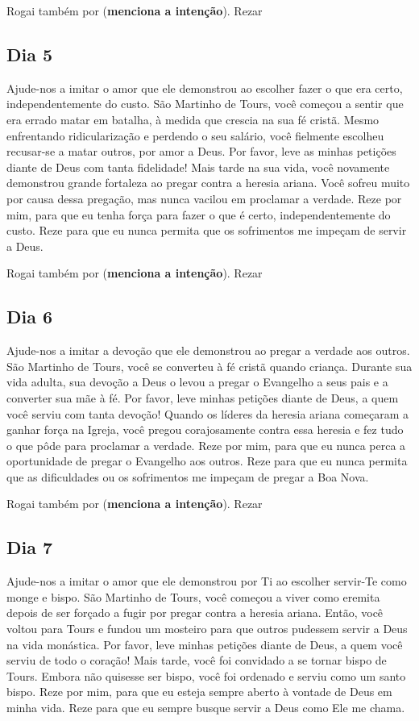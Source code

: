 \documentclass[a4paper,14pt,twoside]{extarticle} \usepackage[utf8]{inputenc}
\begin{document}
Rogai também por (\textbf{menciona a intenção}). Rezar \textbf{}

\subsection{Dia 5}
Ajude-nos a imitar o amor que ele demonstrou ao escolher fazer o que era certo, independentemente do custo. São Martinho de Tours, você começou a sentir que era errado matar em batalha, à medida que crescia na sua fé cristã. Mesmo enfrentando ridicularização e perdendo o seu salário, você fielmente escolheu recusar-se a matar outros, por amor a Deus. Por favor, leve as minhas petições diante de Deus com tanta fidelidade! Mais tarde na sua vida, você novamente demonstrou grande fortaleza ao pregar contra a heresia ariana. Você sofreu muito por causa dessa pregação, mas nunca vacilou em proclamar a verdade. Reze por mim, para que eu tenha força para fazer o que é certo, independentemente do custo. Reze para que eu nunca permita que os sofrimentos me impeçam de servir a Deus. 

Rogai também por (\textbf{menciona a intenção}). Rezar \textbf{}

\subsection{Dia 6}
Ajude-nos a imitar a devoção que ele demonstrou ao pregar a verdade aos outros. São Martinho de Tours, você se converteu à fé cristã quando criança. Durante sua vida adulta, sua devoção a Deus o levou a pregar o Evangelho a seus pais e a converter sua mãe à fé. Por favor, leve minhas petições diante de Deus, a quem você serviu com tanta devoção! Quando os líderes da heresia ariana começaram a ganhar força na Igreja, você pregou corajosamente contra essa heresia e fez tudo o que pôde para proclamar a verdade. Reze por mim, para que eu nunca perca a oportunidade de pregar o Evangelho aos outros. Reze para que eu nunca permita que as dificuldades ou os sofrimentos me impeçam de pregar a Boa Nova. 

Rogai também por (\textbf{menciona a intenção}). Rezar \textbf{}

\subsection{Dia 7}
Ajude-nos a imitar o amor que ele demonstrou por Ti ao escolher servir-Te como monge e bispo. São Martinho de Tours, você começou a viver como eremita depois de ser forçado a fugir por pregar contra a heresia ariana. Então, você voltou para Tours e fundou um mosteiro para que outros pudessem servir a Deus na vida monástica. Por favor, leve minhas petições diante de Deus, a quem você serviu de todo o coração! Mais tarde, você foi convidado a se tornar bispo de Tours. Embora não quisesse ser bispo, você foi ordenado e serviu como um santo bispo. Reze por mim, para que eu esteja sempre aberto à vontade de Deus em minha vida. Reze para que eu sempre busque servir a Deus como Ele me chama. 
\end{document}
